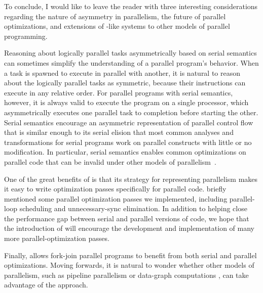
To conclude, I would like to leave the reader with three interesting
considerations regarding the nature of asymmetry in parallelism, the
future of parallel optimizations, and extensions of \tapir-like
systems to other models of parallel programming.

Reasoning about logically parallel tasks asymmetrically based on
serial semantics can sometimes simplify the understanding of a
parallel program's behavior.  When a task is spawned to execute in
parallel with another, it is natural to reason about the logically
parallel tasks as symmetric, because their instructions can execute in
any relative order.  For parallel programs with serial semantics,
however, it is always valid to execute the program on a single
processor, which asymmetrically executes one parallel task to
completion before starting the other.  Serial semantics encourage an
asymmetric representation of parallel control flow that is similar
enough to its serial elision that most common analyses and
transformations for serial programs work on parallel constructs with
little or no modification.  In particular, serial semantics enables
common optimizations on parallel code that can be invalid under other
models of parallelism~\cite{VafeiadisBaCh15}.

One of the great benefits of \tapir is that its strategy for
representing parallelism makes it easy to write optimization passes
specifically for parallel code.   briefly mentioned some
parallel optimization passes we implemented, including parallel-loop
scheduling and unnecessary-sync elimination.  In addition to helping
close the performance gap between serial and parallel versions of
code, we hope that the introduction of \tapir will encourage the
development and implementation of many more parallel-optimization
passes.

Finally, \tapir allows fork-join parallel programs to benefit from
both serial and parallel optimizations.  Moving forwards, it is
natural to wonder whether other models of parallelism, such as
pipeline parallelism \cite{LeeLeSc15, NavarroAsTa09, DuFeAg03} or
data-graph computations \cite{LowGoKy10, LowBiGo12, MalewiczAuBi10,
  NguyenLePi13, NguyenLePi14, ShunBl13, ShunDhBl15}, can take
advantage of the \tapir approach.






